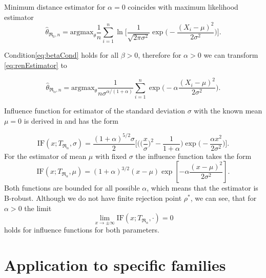 Minimum \ren distance estimator for $\alpha = 0$ coincides with maximum likelihood estimator
\begin{equation}
\hat{\theta}_{\mathfrak{R}_0,n} = \text{argmax}_{\theta} \frac{1}{n}\sum_{i=1}^n \ln \biggl[\frac{1}{\sqrt{2\pi \sigma^2}} \exp\biggl(-\frac{(X_i-\mu)^2}{2\sigma^2}\biggr)\biggr].
\end{equation}

Condition\ref{eq:betaCond} holds for all $\beta > 0$, therefore for $\alpha>0$ we can transform {\mRao} \eqref{eq:renEstimator} to

\begin{equation}
	\hat{\theta}_{\mathfrak{R}_\alpha,n} = \text{argmax}_{\theta} \frac{1}{n\sigma^{\alpha/(1+\alpha)}}\sum_{i=1}^n\exp \biggl(-\alpha\frac{(X_i-\mu)^2}{2\sigma^2}\biggr).
\end{equation}

\noindent Influence function for estimator of the standard deviation $\sigma$ with the known mean $\mu = 0$ is derived in \cite{Vajda2009} and has the form

\begin{equation}
	\text{IF}(x;T_{\mathfrak{R}_{\alpha}},\sigma) = \frac{(1+\alpha)^{5/2}\sigma}{2}\biggl[\biggl(\biggl(\frac{x}{\sigma}\biggr)^2-\frac{1}{1+\alpha}\biggr) \exp\biggl(-\frac{\alpha x^2}{2\sigma^2}\biggr)\biggr].
\end{equation}
For the estimator of mean $\mu$ with fixed $\sigma$ the influence function takes the form
\begin{equation}
	\text{IF}(x;T_{\mathfrak{R}_{\alpha}},\mu) = (1+\alpha )^{3/2} (x-\mu ) \exp\left[{-\alpha\frac{(x-\mu )^2}{2 \sigma ^2}}\right].
\end{equation}
Both functions are bounded for all possible $\alpha$, which means that the estimator is B-robust. Although we do not have finite rejection point $\rho^*$, we can see, that for $\alpha>0$ the limit 
\begin{equation}
	\lim_{x \rightarrow \pm\infty} \mathrm{IF}(x;T_{\mathfrak{R}_\alpha},\cdot) = 0
\end{equation}	
holds for influence functions for both parameters.	
	
	\section{Application to specific families}
	

